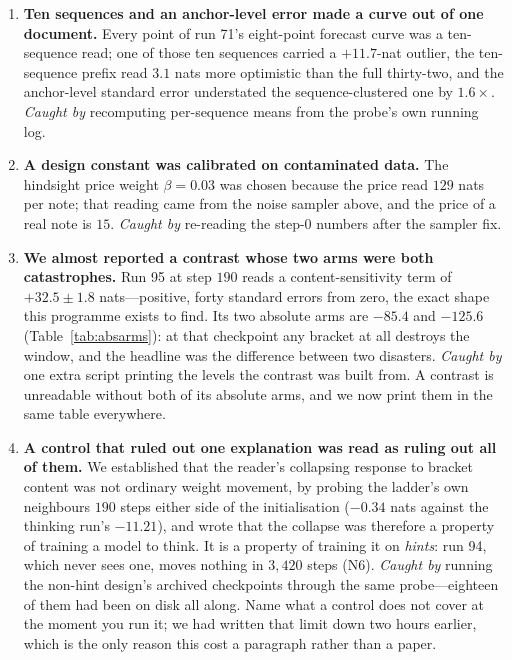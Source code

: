 \documentclass{article} %
\begin{document}
\begin{enumerate}
\item \textbf{Ten sequences and an anchor-level error made a curve out of one document.} Every point of run 71's eight-point forecast curve was a ten-sequence read; one of those ten sequences carried a $+11.7$-nat outlier, the ten-sequence prefix read $3.1$ nats more optimistic than the full thirty-two, and the anchor-level standard error understated the sequence-clustered one by $1.6\times$. \emph{Caught by} recomputing per-sequence means from the probe's own running log.
\item \textbf{A design constant was calibrated on contaminated data.} The hindsight price weight $\beta = 0.03$ was chosen because the price read $129$ nats per note; that reading came from the noise sampler above, and the price of a real note is $15$. \emph{Caught by} re-reading the step-0 numbers after the sampler fix.
\item \textbf{We almost reported a contrast whose two arms were both catastrophes.} Run 95 at step $190$ reads a content-sensitivity term of $+32.5 \pm 1.8$ nats---positive, forty standard errors from zero, the exact shape this programme exists to find. Its two absolute arms are $-85.4$ and $-125.6$ (Table~\ref{tab:absarms}): at that checkpoint any bracket at all destroys the window, and the headline was the difference between two disasters. \emph{Caught by} one extra script printing the levels the contrast was built from. A contrast is unreadable without both of its absolute arms, and we now print them in the same table everywhere.
\item \textbf{A control that ruled out one explanation was read as ruling out all of them.} We established that the reader's collapsing response to bracket content was not ordinary weight movement, by probing the ladder's own neighbours $190$ steps either side of the initialisation ($-0.34$ nats against the thinking run's $-11.21$), and wrote that the collapse was therefore a property of training a model to think. It is a property of training it on \emph{hints}: run 94, which never sees one, moves nothing in $3{,}420$ steps (N6). \emph{Caught by} running the non-hint design's archived checkpoints through the same probe---eighteen of them had been on disk all along. Name what a control does not cover at the moment you run it; we had written that limit down two hours earlier, which is the only reason this cost a paragraph rather than a paper.

\end{enumerate}
\end{document}
